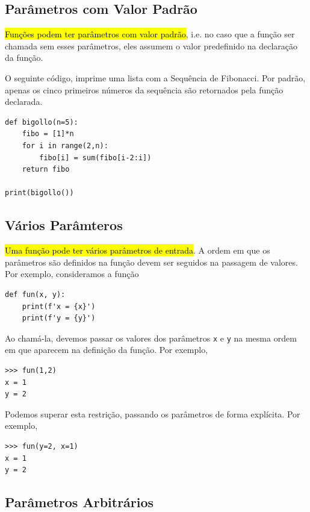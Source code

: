 \subsection{Parâmetros com Valor Padrão}

\hl{Funções podem ter parâmetros com valor padrão}, i.e. no caso que a função ser chamada sem esses parâmetros, eles assumem o valor predefinido na declaração da função.

\begin{ex}
  O seguinte código, imprime uma lista com a Sequência de Fibonacci{\fibonacci}. Por padrão, apenas os cinco primeiros números da sequência são retornados pela função declarada.

\begin{lstlisting}
def bigollo(n=5):
    fibo = [1]*n
    for i in range(2,n):
        fibo[i] = sum(fibo[i-2:i])
    return fibo

print(bigollo())
\end{lstlisting}

\end{ex}

\subsection{Vários Parâmteros}

\hl{Uma função pode ter vários parâmetros de entrada}. A ordem em que os parâmetros são definidos na função devem ser seguidos na passagem de valores. Por exemplo, consideramos a função

\begin{lstlisting}
def fun(x, y):
    print(f'x = {x}')
    print(f'y = {y}')
\end{lstlisting}

Ao chamá-la, devemos passar os valores dos parâmetros \lstinline+x+ e \lstinline+y+ na mesma ordem em que aparecem na definição da função. Por exemplo,

\begin{lstlisting}
>>> fun(1,2)
x = 1
y = 2
\end{lstlisting}

Podemos superar esta restrição, passando os parâmetros de forma explícita. Por exemplo,

\begin{lstlisting}
>>> fun(y=2, x=1)
x = 1
y = 2
\end{lstlisting}

\subsection{Parâmetros Arbitrários}

